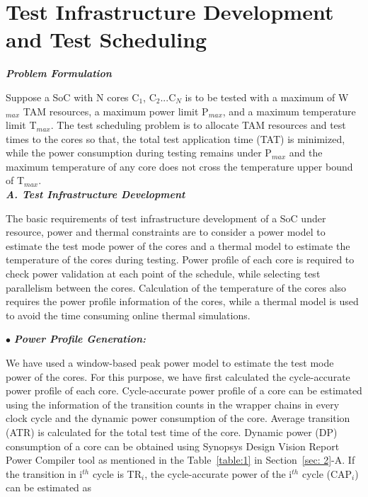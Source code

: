 \documentclass[conference]{IEEEtran}
\begin{document}
	\section{Test Infrastructure Development and Test
Scheduling}
	\label{sec: 3}

	\textbf{\textit{Problem Formulation}}\\
	
	\par
	Suppose a SoC with N cores C$_{1}$, C$_{2}$...C$_{N}$ is to be tested
with a maximum of W$_{max}$ TAM resources, a maximum power
limit P$_{max}$, and a maximum temperature limit T$_{max}$. The
test scheduling problem is to allocate TAM resources and test
times to the cores so that, the total test application time (TAT)
is minimized, while the power consumption during testing
remains under P$_{max}$ and the maximum temperature of any
core does not cross the temperature upper bound of T$_{max}$.\\

\textbf{\textit{A. Test Infrastructure Development}}\\

	\par
	The basic requirements of test infrastructure development
of a SoC under resource, power and thermal constraints are to
consider a power model to estimate the test mode power of the
cores and a thermal model to estimate the temperature of the
cores during testing. Power profile of each core is required to
check power validation at each point of the schedule, while
selecting test parallelism between the cores. Calculation of
the temperature of the cores also requires the power profile
information of the cores, while a thermal model is used to
avoid the time consuming online thermal simulations.

$\bullet$ \hspace{1 cm} \textbf{\textit{Power Profile Generation:}}

	\par
	We have used a window-based peak power model \cite{karmakar2015window} to
estimate the test mode power of the cores. For this purpose,
we have first calculated the cycle-accurate power profile of
each core. Cycle-accurate power profile of a core can be
estimated using the information of the transition counts in
the wrapper chains in every clock cycle and the dynamic
power consumption of the core. Average transition (ATR) is
calculated for the total test time of the core. Dynamic power
(DP) consumption of a core can be obtained using Synopsys
Design Vision Report Power Compiler tool \cite{lettnin2004synthesis} as mentioned
in the Table~\ref{table:1} in Section~\ref{sec: 2}-A. If the transition in i$^{th}$ cycle
is TR$_{i}$, the cycle-accurate power of the i$^{th}$ cycle (CAP$_{i}$) can
be estimated as
\end{document}
